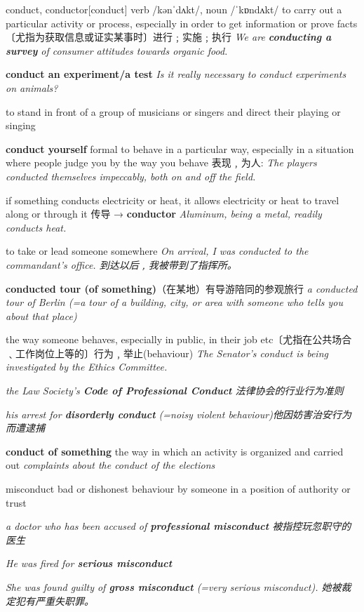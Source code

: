 \begin{DefWord}{conduct, conductor}[conduct]
    verb /kənˈdʌkt/, noun  /ˈkɒndʌkt/ 
    to carry out a particular activity or process, especially in order to get information or prove facts 〔尤指为获取信息或证实某事时〕进行﹔实施﹔执行
    \textit{We are \textbf{conducting a survey} of consumer attitudes towards organic food.}

    \textbf{conduct an experiment/a test}
    \textit{Is it really necessary to conduct experiments on animals?}

    to stand in front of a group of musicians or singers and direct their playing or singing

    \textbf{conduct yourself} formal to behave in a particular way, especially in a situation where people judge you by the way you behave 表现﹐为人:
    \textit{The players conducted themselves impeccably, both on and off the field.}


    if something conducts electricity or heat, it allows electricity or heat to travel along or through it 传导 → \textbf{conductor}
    \textit{Aluminum, being a metal, readily conducts heat.}

    to take or lead someone somewhere
    \textit{On arrival, I was conducted to the commandant’s office. 到达以后﹐我被带到了指挥所。}

    \textbf{conducted tour (of something)}（在某地）有导游陪同的参观旅行
    \textit{a conducted tour of Berlin (=a tour of a building, city, or area with someone who tells you about that place)}

    the way someone behaves, especially in public, in their job etc〔尤指在公共场合﹑工作岗位上等的〕行为﹐举止(behaviour)
    \textit{The Senator’s conduct is being investigated by the Ethics Committee.}

    \textit{the Law Society’s \textbf{Code of Professional Conduct} 法律协会的行业行为准则}

    \textit{his arrest for \textbf{disorderly conduct} (=noisy violent behaviour)他因妨害治安行为而遭逮捕}

    \textbf{conduct of something} the way in which an activity is organized and carried out
   \textit{complaints about the conduct of the elections}
\end{DefWord}

\begin{DefWord}{misconduct}
    bad or dishonest behaviour by someone in a position of authority or trust

    \textit{a doctor who has been accused of \textbf{professional misconduct} 被指控玩忽职守的医生}

    \textit{He was fired for \textbf{serious misconduct}}

    \textit{She was found guilty of \textbf{gross misconduct} (=very serious misconduct). 她被裁定犯有严重失职罪。}
\end{DefWord}


